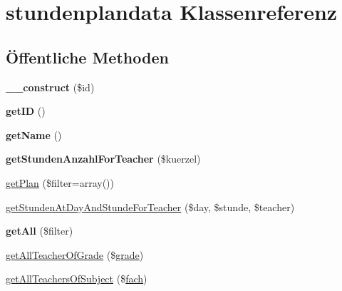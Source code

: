 \hypertarget{classstundenplandata}{}\section{stundenplandata Klassenreferenz}
\label{classstundenplandata}
\subsection*{Öffentliche Methoden}
\begin{DoxyCompactItemize}
\item 
\mbox{\label{classstundenplandata_a91716ecebeb4f213c96f2d6478bc7c3c}} 
{\bfseries \+\_\+\+\_\+construct} (\$id)
\item 
\mbox{\label{classstundenplandata_a4546bbab6b68bdf68b42993e6eebe8a2}} 
{\bfseries get\+ID} ()
\item 
\mbox{\label{classstundenplandata_ac2eb0775ef30ccbd1a6575880ab4c6a4}} 
{\bfseries get\+Name} ()
\item 
\mbox{\label{classstundenplandata_aa59854ba1439d079cd90455da041e599}} 
{\bfseries get\+Stunden\+Anzahl\+For\+Teacher} (\$kuerzel)
\item 
\mbox{\hyperlink{classstundenplandata_a5fdd7d468ed8253d8563d74e0a25cb40}{get\+Plan}} (\$filter=array())
\item 
\mbox{\hyperlink{classstundenplandata_a1fc079e82f1cffef32470b4c65cdc024}{get\+Stunden\+At\+Day\+And\+Stunde\+For\+Teacher}} (\$day, \$stunde, \$teacher)
\item 
\mbox{\label{classstundenplandata_a0e827c2679772e27454dcfbdf692d3ec}} 
{\bfseries get\+All} (\$filter)
\item 
\mbox{\hyperlink{classstundenplandata_afc9416fd68d591237442ba9af00e0d2e}{get\+All\+Teacher\+Of\+Grade}} (\$\mbox{\hyperlink{classgrade}{grade}})
\item 
\mbox{\hyperlink{classstundenplandata_ac8617cfb4d9aac5e8214cd56af94afac}{get\+All\+Teachers\+Of\+Subject}} (\$\mbox{\hyperlink{classfach}{fach}})
\item 
\mbox{\label{classstundenplandata_adcc66df486570ba1081448dd886953b8}} 

\end{DoxyCompactItemize}
